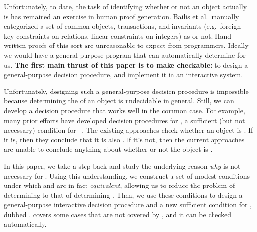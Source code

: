 Unfortunately, to date, the task of identifying whether or not an object
actually is \invariantconfluent{} has remained an exercise in human proof
generation. Bailis et al.\ manually categorized a set of common objects,
transactions, and invariants (e.g.\ foreign key constraints on relations,
linear constraints on integers) as \invariantconfluent{} or not. Hand-written
proofs of this sort are unreasonable to expect from programmers. Ideally we
would have a general-purpose program that can automatically determine
\invariantconfluence{} for us. \textbf{The first main thrust of this paper is
to make \invariantconfluence{} checkable:} to design a general-purpose
\invariantconfluence{} decision procedure, and implement it in an interactive
system.

Unfortunately, designing such a general-purpose decision procedure is
impossible because determining the \invariantconfluence{} of an object is
undecidable in general. Still, we can develop a decision procedure that works
well in the common case.
%
For example, many prior efforts have developed decision procedures for
\emph{\invariantclosure{}}, a sufficient (but not necessary) condition for
\invariantconfluence{}~\cite{li2012making, li2014automating}. The existing
approaches check whether an object is \invariantclosed{}. If it is, then they
conclude that it is also \invariantconfluent{}. If it's not, then the current
approaches are unable to conclude anything about whether or not the object is
\invariantconfluent{}.

In this paper, we take a step back and study the underlying reason \emph{why}
\invariantclosure{} is not necessary for \invariantconfluence{}.
%
%
Using this understanding, we construct a set of modest conditions under which
\invariantclosure{} and \invariantconfluence{} are in fact \emph{equivalent},
allowing us to reduce the problem of determining \invariantconfluence{} to that
of determining \invariantclosure{}.
%
Then, we use these conditions to design a general-purpose interactive
\invariantconfluence{} decision procedure and a new sufficient condition for
\invariantconfluence{}, dubbed \emph{\mergereducibility}. \Mergereducibility{}
covers some cases that are not covered by \invariantclosure{}, and it can be
checked automatically.

